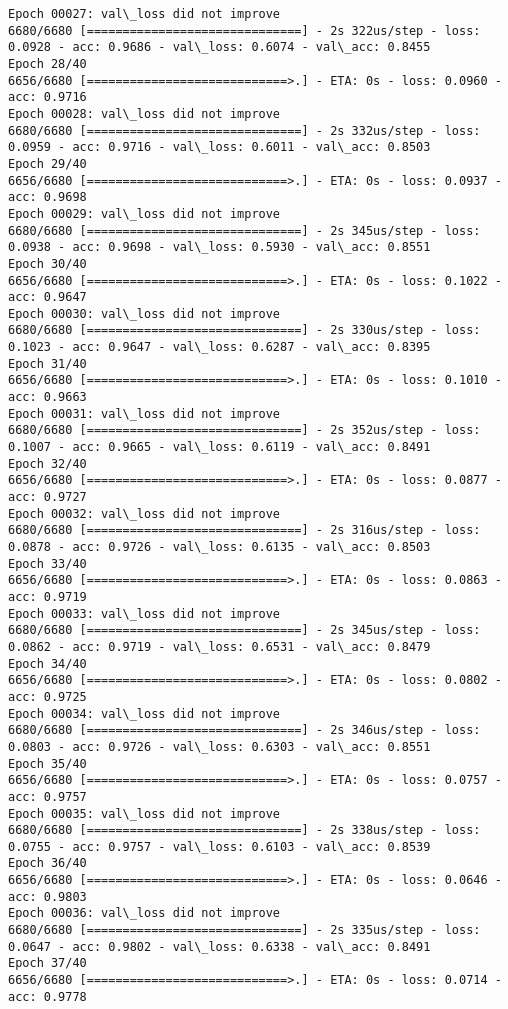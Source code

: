 \documentclass[11pt]{article}
\begin{document}
\begin{Verbatim}[commandchars=\\\{\}]
Epoch 00027: val\_loss did not improve
6680/6680 [==============================] - 2s 322us/step - loss: 0.0928 - acc: 0.9686 - val\_loss: 0.6074 - val\_acc: 0.8455
Epoch 28/40
6656/6680 [============================>.] - ETA: 0s - loss: 0.0960 - acc: 0.9716
Epoch 00028: val\_loss did not improve
6680/6680 [==============================] - 2s 332us/step - loss: 0.0959 - acc: 0.9716 - val\_loss: 0.6011 - val\_acc: 0.8503
Epoch 29/40
6656/6680 [============================>.] - ETA: 0s - loss: 0.0937 - acc: 0.9698
Epoch 00029: val\_loss did not improve
6680/6680 [==============================] - 2s 345us/step - loss: 0.0938 - acc: 0.9698 - val\_loss: 0.5930 - val\_acc: 0.8551
Epoch 30/40
6656/6680 [============================>.] - ETA: 0s - loss: 0.1022 - acc: 0.9647
Epoch 00030: val\_loss did not improve
6680/6680 [==============================] - 2s 330us/step - loss: 0.1023 - acc: 0.9647 - val\_loss: 0.6287 - val\_acc: 0.8395
Epoch 31/40
6656/6680 [============================>.] - ETA: 0s - loss: 0.1010 - acc: 0.9663
Epoch 00031: val\_loss did not improve
6680/6680 [==============================] - 2s 352us/step - loss: 0.1007 - acc: 0.9665 - val\_loss: 0.6119 - val\_acc: 0.8491
Epoch 32/40
6656/6680 [============================>.] - ETA: 0s - loss: 0.0877 - acc: 0.9727
Epoch 00032: val\_loss did not improve
6680/6680 [==============================] - 2s 316us/step - loss: 0.0878 - acc: 0.9726 - val\_loss: 0.6135 - val\_acc: 0.8503
Epoch 33/40
6656/6680 [============================>.] - ETA: 0s - loss: 0.0863 - acc: 0.9719
Epoch 00033: val\_loss did not improve
6680/6680 [==============================] - 2s 345us/step - loss: 0.0862 - acc: 0.9719 - val\_loss: 0.6531 - val\_acc: 0.8479
Epoch 34/40
6656/6680 [============================>.] - ETA: 0s - loss: 0.0802 - acc: 0.9725
Epoch 00034: val\_loss did not improve
6680/6680 [==============================] - 2s 346us/step - loss: 0.0803 - acc: 0.9726 - val\_loss: 0.6303 - val\_acc: 0.8551
Epoch 35/40
6656/6680 [============================>.] - ETA: 0s - loss: 0.0757 - acc: 0.9757
Epoch 00035: val\_loss did not improve
6680/6680 [==============================] - 2s 338us/step - loss: 0.0755 - acc: 0.9757 - val\_loss: 0.6103 - val\_acc: 0.8539
Epoch 36/40
6656/6680 [============================>.] - ETA: 0s - loss: 0.0646 - acc: 0.9803
Epoch 00036: val\_loss did not improve
6680/6680 [==============================] - 2s 335us/step - loss: 0.0647 - acc: 0.9802 - val\_loss: 0.6338 - val\_acc: 0.8491
Epoch 37/40
6656/6680 [============================>.] - ETA: 0s - loss: 0.0714 - acc: 0.9778

\end{Verbatim}
\end{document}
